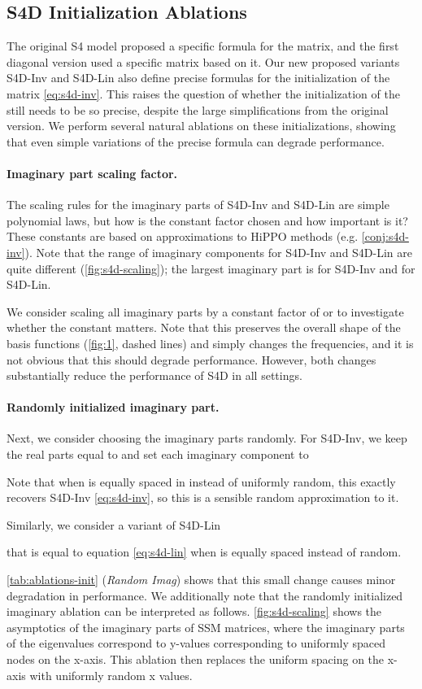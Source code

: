 \documentclass{article}
\newcommand{\para}[1]{\paragraph{#1}}
\begin{document}
\subsection{S4D Initialization Ablations}
\label{sec:experiments:init}

The original S4 model proposed a specific formula for the  matrix,
and the first diagonal version \citep{gupta2022diagonal} used a specific matrix based on it.
Our new proposed variants S4D-Inv and S4D-Lin also define precise formulas for the initialization of the  matrix \eqref{eq:s4d-inv}.
This raises the question of whether the initialization of the  still needs to be so precise, despite the large simplifications from the original version.
We perform several natural ablations on these initializations, showing that even simple variations of the precise formula can degrade performance.

\para{Imaginary part scaling factor.}
The scaling rules for the imaginary parts of S4D-Inv and S4D-Lin are simple polynomial laws, but how is the constant factor chosen and how important is it?
These constants are based on approximations to HiPPO methods (e.g. \cref{conj:s4d-inv}).
Note that the range of imaginary components for S4D-Inv and S4D-Lin are quite different (\cref{fig:s4d-scaling}); the largest imaginary part is  for S4D-Inv and  for S4D-Lin.

We consider scaling all imaginary parts by a constant factor of  or  to investigate whether the constant matters.
Note that this preserves the overall shape of the basis functions (\cref{fig:1}, dashed lines) and simply changes the frequencies,
and it is not obvious that this should degrade performance.
However, both changes substantially reduce the performance of S4D in all settings.


\para{Randomly initialized imaginary part.}
Next, we consider choosing the imaginary parts randomly.
For S4D-Inv, we keep the real parts equal to  and set each imaginary component to

Note that when  is equally spaced in  instead of uniformly random, this exactly recovers S4D-Inv \eqref{eq:s4d-inv}, so this is a sensible random approximation to it.

Similarly, we consider a variant of S4D-Lin

that is equal to equation \eqref{eq:s4d-lin} when  is equally spaced instead of random.

\cref{tab:ablations-init} (\emph{Random Imag}) shows that this small change causes minor degradation in performance.
We additionally note that the randomly initialized imaginary ablation can be interpreted as follows.
\cref{fig:s4d-scaling} shows the asymptotics of the imaginary parts of SSM matrices, where the imaginary parts of the eigenvalues correspond to y-values corresponding to uniformly spaced nodes on the x-axis.
This ablation then replaces the uniform spacing on the x-axis with uniformly random x values.
\end{document}
